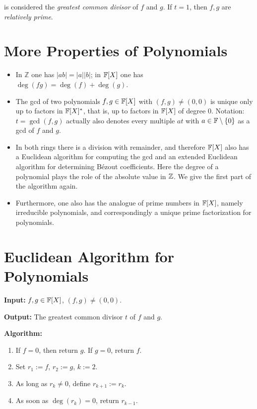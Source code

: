 is considered the \emph{greatest common divisor} of \(f\) and \(g\). If \(t = 1\),  then \(f,g\) are \emph{relatively prime}.

\section{More Properties of Polynomials}

\begin{itemize}

	\item In \(\mathbb{Z}\) one has \(|ab| = |a||b|\); in \(\mathbb{F}[X]\) one has
	      \(\deg(fg) = \deg(f) + \deg(g)\).

	\item The gcd of two polynomials \(f, g \in \mathbb{F}[X]\) with \((f,g) \neq (0,0)\) is unique only up to factors in \(\mathbb{F}[X]^{\ast}\),
	      that is, up to factors in \(\mathbb{F}[X]\) of degree \(0\). Notation: \(t = \gcd(f,g)\) actually also denotes every multiple \(a t\) with
	      \(a \in \mathbb{F} \setminus \{0\}\) as a gcd of \(f\) and \(g\).

	\item In both rings there is a division with remainder, and therefore \(\mathbb{F}[X]\) also has a Euclidean algorithm for computing
	      the gcd and an extended Euclidean algorithm for determining Bézout coefficients. Here the degree of a polynomial plays the role of the
	      absolute value in \(\mathbb{Z}\). We give the first part of the algorithm again.

	\item Furthermore, one also has the analogue of prime numbers in \(\mathbb{F}[X]\), namely irreducible polynomials, and correspondingly a unique prime
	      factorization for polynomials.

\end{itemize}

\section{Euclidean Algorithm for Polynomials}

\textbf{Input:} \(f, g \in \mathbb{F}[X]\), \((f, g) \neq (0,0)\).

\textbf{Output:} The greatest common divisor \(t\) of \(f\) and \(g\).

\textbf{Algorithm:}

\begin{enumerate}

	\item If \(f = 0\), then return \(g\). If \(g = 0\), return \(f\).

	\item Set \(r_1 := f\), \(r_2 := g\), \(k := 2\).

	\item As long as \(r_k \neq 0\), define \(r_{k+1} := r_k\).

	\item As soon as \(\deg(r_k) = 0\), return \(r_{k-1}\).

\end{enumerate}

